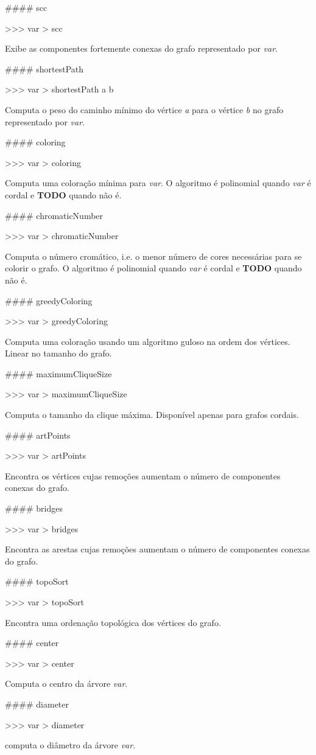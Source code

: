 \#\#\#\# scc 
\begin{DoxyCode}
>>> var > scc
\end{DoxyCode}
 Exibe as componentes fortemente conexas do grafo representado por {\itshape var}.

\#\#\#\# shortest\+Path 
\begin{DoxyCode}
>>> var > shortestPath a b
\end{DoxyCode}
 Computa o peso do caminho mínimo do vértice {\itshape a} para o vértice {\itshape b} no grafo representado por {\itshape var}.

\#\#\#\# coloring 
\begin{DoxyCode}
>>> var > coloring
\end{DoxyCode}
 Computa uma coloração mínima para {\itshape var}. O algoritmo é polinomial quando {\itshape var} é cordal e {\bfseries T\+O\+DO} quando não é.

\#\#\#\# chromatic\+Number 
\begin{DoxyCode}
>>> var > chromaticNumber
\end{DoxyCode}
 Computa o número cromático, i.\+e. o menor número de cores necessárias para se colorir o grafo. O algoritmo é polinomial quando {\itshape var} é cordal e {\bfseries T\+O\+DO} quando não é.

\#\#\#\# greedy\+Coloring 
\begin{DoxyCode}
>>> var > greedyColoring
\end{DoxyCode}
 Computa uma coloração usando um algoritmo guloso na ordem dos vértices. Linear no tamanho do grafo.

\#\#\#\# maximum\+Clique\+Size 
\begin{DoxyCode}
>>> var > maximumCliqueSize
\end{DoxyCode}
 Computa o tamanho da clique máxima. Disponível apenas para grafos cordais.

\#\#\#\# art\+Points 
\begin{DoxyCode}
>>> var > artPoints
\end{DoxyCode}
 Encontra os vértices cujas remoções aumentam o número de componentes conexas do grafo.

\#\#\#\# bridges 
\begin{DoxyCode}
>>> var > bridges
\end{DoxyCode}
 Encontra as arestas cujas remoções aumentam o número de componentes conexas do grafo.

\#\#\#\# topo\+Sort 
\begin{DoxyCode}
>>> var > topoSort
\end{DoxyCode}
 Encontra uma ordenação topológica dos vértices do grafo.

\#\#\#\# center 
\begin{DoxyCode}
>>> var > center
\end{DoxyCode}
 Computa o centro da árvore {\itshape var}.

\#\#\#\# diameter 
\begin{DoxyCode}
>>> var > diameter
\end{DoxyCode}
 computa o diâmetro da árvore {\itshape var}. 